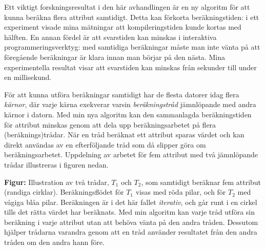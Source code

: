 \documentclass[10pt, twoside, openright]{book}
\begin{document}
\vspace{1em}

Ett viktigt forskningsresultat i den här avhandlingen är en ny algoritm för att kunna beräkna
flera attribut samtidigt. Detta kan förkorta beräkningstiden: i ett experiment visade mina
mätningar att kompileringstiden kunde kortas med hälften.
En annan fördel är att svarstiden kan minskas i interaktiva
programmeringsverktyg: med samtidiga beräkningar måste man inte vänta på att föregående beräkningar
är klara innan man börjar på den nästa. Mina experimentella resultat visar att svarstiden kan minskas
från sekunder till under en millisekund.

\newpage
För att kunna utföra beräkningar samtidigt har de flesta datorer idag flera
\emph{kärnor}, där varje kärna exekverar varsin \emph{beräkningstråd}
jämnlöpande med andra kärnor i datorn.
Med min nya algoritm kan den sammanlagda beräkningstiden för attribut minskas genom att dela upp
beräkningsarbetet på flera (beräknings)trådar.
När en tråd beräknat ett attribut sparas värdet och kan direkt användas av en efterföljande tråd
som då slipper göra om beräkningsarbetet.
Uppdelning av arbetet för fem attribut med två jämnlöpande trådar illustreras i figuren nedan.

\begin{center}
\end{center}

\noindent
\textbf{Figur:} Illustration av två trådar, $T_1$ och $T_2$, som samtidigt beräknar fem
attribut (randiga cirklar).
Beräkningsflödet för $T_1$ visas med röda pilar,
och för $T_2$ med vågiga blåa pilar.
Beräkningen är i det här fallet \emph{iterativ}, och går runt i en cirkel tills det rätta värdet har
beräknats.
Med min algoritm kan varje tråd utföra sin beräkning i varje attribut utan att
behöva vänta på den andra tråden. Dessutom hjälper trådarna varandra genom att en tråd använder
resultatet från den andra tråden om den andra hann före.
\end{document}
